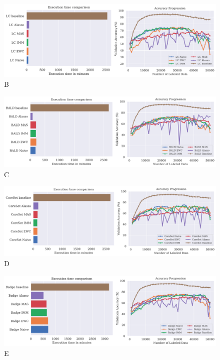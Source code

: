 \begin{figure} [ht]
    \centering
    \includegraphics[width=\linewidth]{images/results_CAL/LC_CAL_1000b.png}
    \caption[Continual Active Learning Random 1000 batch size]{B}
    \label{fig:Evaluation:Results:CAL:LC1000}
\end{figure}

\begin{figure} [ht]
    \centering
    \includegraphics[width=\linewidth]{images/results_CAL/Bald_CAL_1000b.png}
    \caption[Continual Active Learning BALD 1000 batch size]{C}
    \label{fig:Evaluation:Results:CAL:BALD1000}
\end{figure}

\begin{figure} [ht]
    \centering
    \includegraphics[width=\linewidth]{images/results_CAL/CoreSet_CAL_1000b.png}
    \caption[Continual Active Learning CoreSet 1000 batch size]{D}
    \label{fig:Evaluation:Results:CAL:CoreSet1000}
\end{figure}

\begin{figure} [ht]
    \centering
    \includegraphics[width=\linewidth]{images/results_CAL/Badge_CAL_1000b.png}
    \caption[Continual Active Learning Badge 1000 batch size]{E}
    \label{fig:Evaluation:Results:CAL:Badge1000}
\end{figure}




